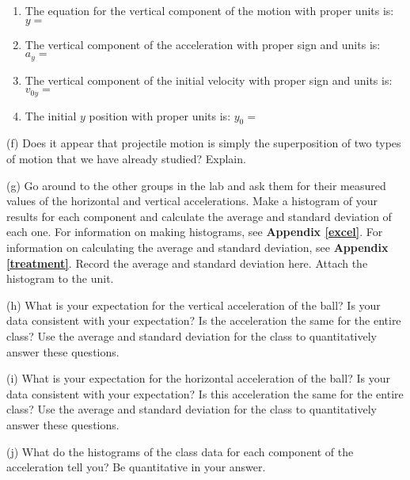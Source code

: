 \begin{enumerate}
\item The equation for the vertical component of the motion with proper units is:
$y =$\vspace{5mm}

\item The vertical component of the acceleration with proper sign and units is: 
\( a_{y}= \)
\vspace{5mm}

\item The vertical component of the initial velocity with proper sign and units is:
\( v_{0y}= \) \vspace{5mm}

\item The initial $y$ position with proper units is: \( y_{0} =\) \vspace{5mm}

\end{enumerate}
(f) Does it appear that projectile motion is simply the superposition of two
types of motion that we have already studied? Explain.
\vspace{20mm}

(g) Go around to the other groups in the lab and ask them for their measured values of the horizontal and vertical accelerations.
Make a histogram of your results for each component and calculate the average and standard deviation of each one.
For information on making histograms, see \textbf{Appendix \ref{excel}}. For information on calculating the average and
standard deviation, see \textbf{Appendix \ref{treatment}}. Record the average and standard deviation here.
Attach the histogram to the unit.
\vspace{20mm}

(h) What is your expectation for the vertical acceleration of the ball? Is your data consistent with your expectation?
Is the acceleration the same for the entire class? 
Use the average and standard deviation for the class to quantitatively answer these questions.
\vspace{20mm}

(i) What is your expectation for the horizontal acceleration of the ball?  Is your data consistent with your expectation?
Is this acceleration the same for the entire class? 
Use the average and standard deviation for the class to quantitatively answer these questions.
\vspace{20mm}

(j) What do the histograms of the class data for each component of the acceleration tell you? Be quantitative in your answer.
\vspace{20mm}

